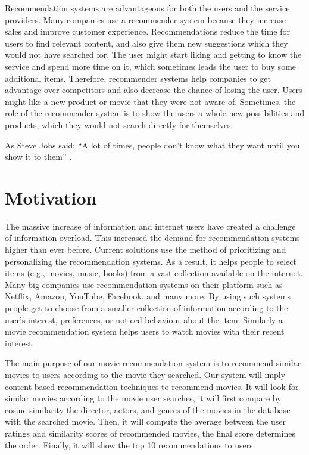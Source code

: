 Recommendation systems are advantageous for both the users and the service providers. Many companies use a recommender system because they increase sales and improve customer experience. Recommendations reduce the time for users to find relevant content, and also give them new suggestions which they would not have searched for. The user might start liking and getting to know the service and spend more time on it, which sometimes leads the user to buy some additional items. Therefore, recommender systems help companies to get advantage over competitors and also decrease the chance of losing the user. Users might like a new product or movie that they were not aware of. Sometimes, the role of the recommender system is to show the users a whole new possibilities and products, which they would not search directly for themselves.

As Steve Jobs said: “A lot of times, people don’t know what they want until you show it to them” \cite{steve-jobs}.


\section{Motivation}

The massive increase of information and internet users have created a challenge of information overload. This increased the demand for recommendation systems higher than ever before. Current solutions use the method of prioritizing and personalizing the recommendation systems. As a result, it helps people to select items (e.g., movies, music, books) from a vast collection available on the internet. Many big companies use recommendation systems on their platform such as Netflix, Amazon, YouTube, Facebook, and many more. By using such systems people get to choose from a smaller collection of information according to the user's interest, preferences, or noticed behaviour about the item. Similarly a movie recommendation system helps users to watch movies with their recent interest. 

The main purpose of our movie recommendation system is to recommend similar movies to users according to the movie they searched. Our system will imply content based recommendation techniques to recommend movies. It will look for similar movies according to the movie user searches, it will first compare by cosine similarity the director, actors, and genres of the movies in the database with the searched movie. Then, it will compute the average between the user ratings and similarity scores of recommended movies, the final score determines the order. Finally, it will show the top 10 recommendations to users.

